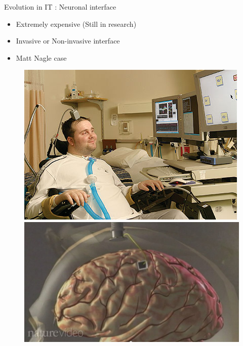 \documentclass{beamer}
\begin{document}
\begin{frame}{Evolution in IT : Neuronal interface}
\begin{itemize}
\item Extremely expensive (Still in research)
\item Invasive or Non-invasive interface
\item Matt Nagle case
\end{itemize}
\begin{figure}[ht]
\begin{minipage}[b]{0.30\linewidth}
\centering
\includegraphics[width=\textwidth]{matt-nagle.jpg}


\end{minipage}
\hspace{0.15cm}
\begin{minipage}[b]{0.40\linewidth}
\centering
\includegraphics[width=\textwidth]{brain-chip.jpg}
\end{minipage}
\end{figure}
\end{frame}
\end{document}
